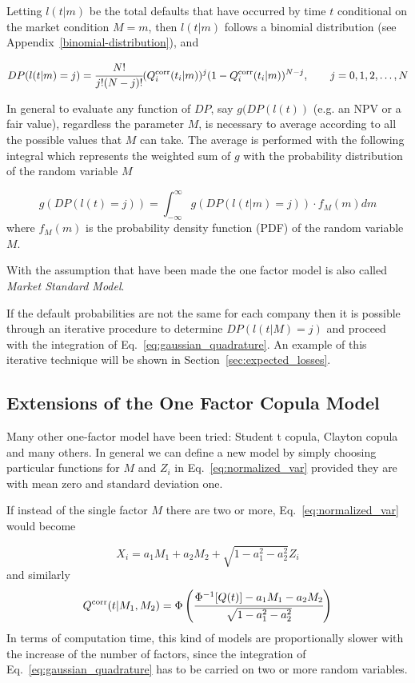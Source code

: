 Letting \(l(t|m)\) be the total defaults that
have occurred by time \(t\) conditional on the market condition
\(M = m\), then \(l(t|m)\) follows a binomial distribution (see Appendix~\ref{binomial-distribution}), and

\begin{equation}
DP(l(t|m) = j) = \cfrac{N!}{j!(N-j)!}(Q_i^{\textrm{corr}}(t_i|m))^j(1-Q_i^{\textrm{corr}}(t_i|m))^{N-j},\qquad  j=0, 1, 2,\ldots,N
\end{equation}

In general to evaluate any function of $DP$, say $g(DP(l(t))$ (e.g. an NPV or a fair value), regardless the parameter $M$, is necessary to average according to all the possible values that $M$ can take. The average is performed with the following integral which represents the weighted sum of $g$ with the probability distribution of the random variable $M$  

\begin{equation}
g(DP(l(t) = j)) = \int_{-\infty}^{\infty}{g(DP(l(t|m) = j))\cdot f_M(m)dm}
\label{eq:gaussian_quadrature}
\end{equation}
where $f_M(m)$ is the probability density function (PDF) of the random variable $M$.

With the assumption that have been made the one factor model is also called \emph{Market Standard Model}.

If the default probabilities are not the same for each company then it is possible through an iterative procedure to determine $DP(l(t|M)=j)$ and proceed with the integration of Eq.~\ref{eq:gaussian_quadrature}.
An example of this iterative technique will be shown in Section~\ref{sec:expected_losses}.

\subsection{Extensions of the One Factor Copula Model}
Many other one-factor model have been tried: Student t copula, Clayton copula and many others. In general we can define a new model by simply choosing particular functions for $M$ and $Z_i$ in Eq.~\ref{eq:normalized_var} provided they are with mean zero and standard deviation one. 

If instead of the single factor $M$ there are two or more, Eq.~\ref{eq:normalized_var} would become

\begin{equation}
X_i = a_1 M_1 + a_2 M_2 + \sqrt{1 - a_1^2 - a^2_2}Z_i
\end{equation}
and similarly
\begin{equation}
Q^{\textrm{corr}}(t|M_1, M_2) = \Phi\left(\cfrac{\Phi^{-1}[Q(t)]-a_1 M_1 - a_2 M_2}{\sqrt{1 - a_1^2 - a^2_2}}\right)
\end{equation}
In terms of computation time, this kind of models are proportionally slower with the increase of the number of factors, since the integration of Eq.~\ref{eq:gaussian_quadrature} has to be carried on two or more random variables.

